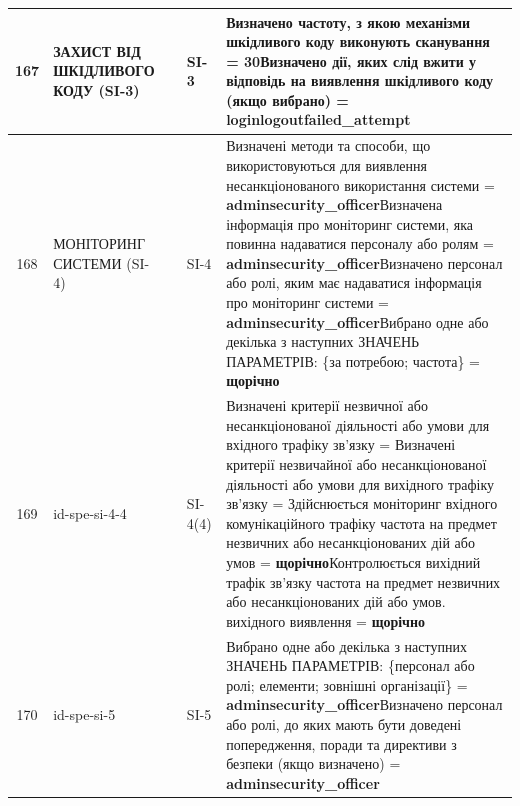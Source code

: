 \documentclass[10pt]{article}
\begin{document}
\begin{longtable}{|c|>{\raggedright\arraybackslash}p{4cm}|>{\raggedright\arraybackslash}p{2.5cm}|>{\raggedright\arraybackslash}p{3.5cm}|>{\raggedright\arraybackslash}p{5.5cm}|}
167 & ЗАХИСТ ВІД ШКІДЛИВОГО КОДУ (SI-3) &  & SI-3 & Визначено частоту, з якою механізми шкідливого коду виконують сканування = \textbf{30}\newline Визначено дії, яких слід вжити у відповідь на виявлення шкідливого коду (якщо вибрано) = \textbf{loginlogoutfailed\_\allowbreak{}attempt} \\ \hline
168 & МОНІТОРИНГ СИСТЕМИ (SI-4) &  & SI-4 & Визначені методи та способи, що використовуються для виявлення несанкціонованого використання системи = \textbf{adminsecurity\_\allowbreak{}officer}\newline Визначена інформація про моніторинг системи, яка повинна надаватися персоналу або ролям = \textbf{adminsecurity\_\allowbreak{}officer}\newline Визначено персонал або ролі, яким має надаватися інформація про моніторинг системи = \textbf{adminsecurity\_\allowbreak{}officer}\newline Вибрано одне або декілька з наступних ЗНАЧЕНЬ ПАРАМЕТРІВ: \{за потребою; частота\} = \textbf{щорічно} \\ \hline
169 & id-spe-si-4-4 &  & SI-4(4) & Визначені критерії незвичної або несанкціонованої діяльності або умови для вхідного трафіку зв'язку = \textbf{}\newline Визначені критерії незвичайної або несанкціонованої діяльності або умови для вихідного трафіку зв'язку = \textbf{}\newline Здійснюється моніторинг вхідного комунікаційного трафіку частота на предмет незвичних або несанкціонованих дій або умов = \textbf{щорічно}\newline Контролюється вихідний трафік зв'язку частота на предмет незвичних або несанкціонованих дій або умов. вихідного виявлення = \textbf{щорічно} \\ \hline
170 & id-spe-si-5 &  & SI-5 & Вибрано одне або декілька з наступних ЗНАЧЕНЬ ПАРАМЕТРІВ: \{персонал або ролі; елементи; зовнішні організації\} = \textbf{adminsecurity\_\allowbreak{}officer}\newline Визначено персонал або ролі, до яких мають бути доведені попередження, поради та директиви з безпеки (якщо визначено) = \textbf{adminsecurity\_\allowbreak{}officer} \\ \hline

\end{longtable}
\end{document}
